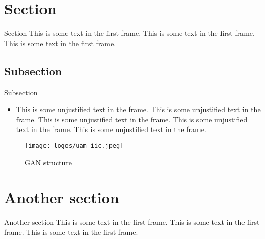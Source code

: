 
\renewcommand{\sectiontitle}{Section}
\section{\sectiontitle}

\begin{frame}{\sectiontitle}
    This is some text in the first frame. This is some text in the first frame. This is some text in the first frame.
\end{frame}

\renewcommand{\subsectiontitle}{Subsection}
\subsection{\subsectiontitle}
\begin{frame}{\subsectiontitle}
    \begin{itemize}
        \itemj Justified text item with reference \citet{goodfellow2014generative} 
        \item This is some unjustified text in the frame. This is some unjustified text in the frame. This is some unjustified text in the frame. This is some unjustified text in the frame. This is some unjustified text in the frame.
    \end{itemize}
    
    \begin{figure}
    \centering
        \texttt{[image: logos/uam-iic.jpeg]}
        \caption{GAN structure}
        \label{fig:gan_structure}
    \end{figure}
\end{frame}

\renewcommand{\sectiontitle}{Another section}
\section{\sectiontitle}

\begin{frame}{\sectiontitle}
    This is some text in the first frame. This is some text in the first frame. This is some text in the first frame.
\end{frame}


